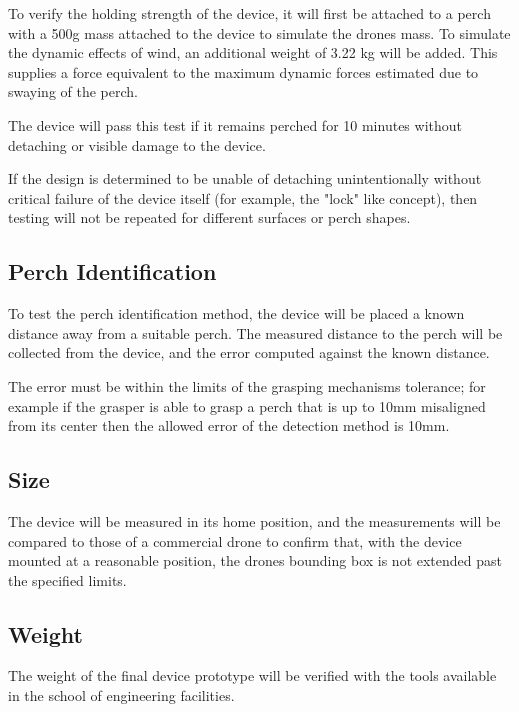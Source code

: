 To verify the holding strength of the device, it will first be attached to a perch with a 500g mass attached to the device
to simulate the drones mass.
To simulate the dynamic effects of wind, an additional weight of 3.22 kg will be added. This supplies a force equivalent
to the maximum dynamic forces estimated due to swaying of the perch.

The device will pass this test if it remains perched for 10 minutes %
without detaching or visible damage to the device.

If the design is determined to be unable of detaching unintentionally without critical failure of the device 
itself (for example, the "lock" like concept), then testing will not be repeated for different surfaces or perch shapes.

\subsection{Perch Identification}

To test the perch identification method, the device will be placed a known distance away from a suitable
perch. The measured distance to the perch will be collected from the device, and the error computed
against the known distance. 

The error must be within the limits of the grasping mechanisms tolerance; for example if the grasper
is able to grasp a perch that is up to 10mm misaligned from its center then the allowed error of the
detection method is 10mm.


\subsection{Size}

The device will be measured in its home position, and the measurements will be compared to those of a commercial drone 
to confirm that, with the device mounted at a reasonable position, the drones bounding box is not extended past the specified
limits.

\subsection{Weight}

The weight of the final device prototype will be verified with the tools available in the school of engineering facilities.


\pagebreak
